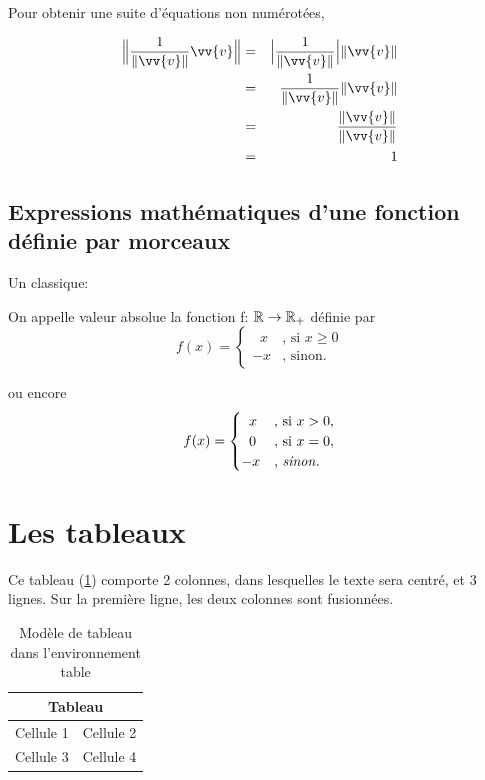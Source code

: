 Pour obtenir une suite d'équations non numérotées, 

\begin{eqnarray*}
\Big\|{\frac{1}{\| \vv{v}\|}\vv{v}} \Big\|&=& \Big |\frac{1}{\| \vv{v}\|} \Big |\| \vv{v}\| \\
&=&\frac{1}{\| \vv{v}\|}\| \vv{v}\| \\
&=&\frac{\| \vv{v}\|}{\| \vv{v}\|} \\
&=&1
\end{eqnarray*}

\subsection{Expressions mathématiques d'une fonction définie par morceaux }\label{morceaux} 

Un classique:
\begin{definition}
On appelle valeur absolue la fonction
{f}: $\Bbb{R} \rightarrow \Bbb{R}_+$ définie par
\[f(x)=
\begin{cases}
\;\;x & \text{, si } x \geq 0 \\
-x & \text{, sinon}.
\end{cases}
\]
\end{definition}

ou encore 
\[f(x)=
\begin{cases}
\; \;x & \text{, si } x > 0, \\
\; \;0& \text{, si } x = 0, \\
-x & \text{, \emph{sinon}}.
\end{cases}
\]

\section{Les tableaux}\label{tab}

\bigskip

Ce tableau (\ref{Tableau1}) comporte 2 colonnes, dans lesquelles le texte sera centré, et 3 lignes.
Sur la première ligne, les deux colonnes sont fusionnées.

 \begin{table}[ht]
\begin{center}
\begin{tabular}{|c|c|}
\hline
\multicolumn{2}{|c|}{Tableau}\\
\hline
Cellule 1&Cellule 2\\
\hline
Cellule 3&Cellule 4\\
\hline
\end{tabular}
\end{center}
\caption{ \label{Tableau1} {Mod\`{e}le de tableau dans l'environnement table} }
\end{table}

